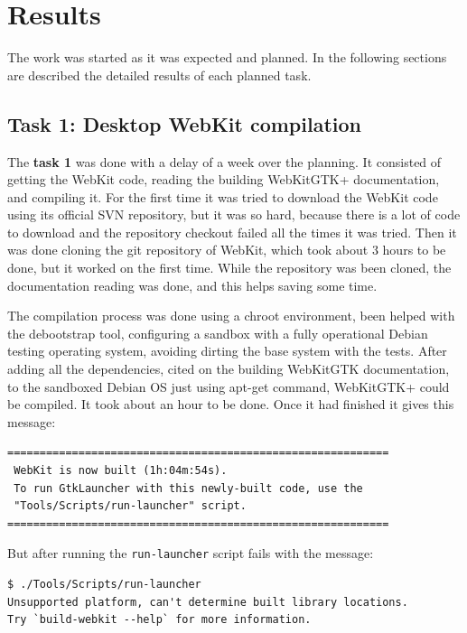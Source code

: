 \documentclass[a4paper,11pt,openany]{report}
\begin{document}
\chapter{Results}
The work was started as it was expected and planned. In the following sections are described the detailed results of each planned task.

\section{Task 1: Desktop WebKit compilation}
The \textbf{task 1} was done with a delay of a week over the planning. It consisted of getting the WebKit code, reading the building WebKitGTK+\cite{build webkitgtk+} documentation, and compiling it.
For the first time it was tried to download the WebKit code using its official SVN repository, but it was so hard, because there is a lot of code to download and the repository checkout failed all the times it was tried. Then it was done cloning the git repository of WebKit\cite{git webkit}, which took about 3 hours to be done, but it worked on the first time.
While the repository was been cloned, the documentation reading was done, and this helps saving some time.

The compilation process was done using a chroot\cite{chroot} environment, been helped with the debootstrap\cite{debootstrap} tool, configuring a sandbox with a fully operational Debian testing operating system, avoiding dirting the base system with the tests.
After adding all the dependencies, cited on the building WebKitGTK documentation, to the sandboxed Debian OS just using apt-get command, WebKitGTK+ could be compiled. It took about an hour to be done. Once it had finished it gives this message:

{
\footnotesize
\begin{lstlisting}
===========================================================
 WebKit is now built (1h:04m:54s).
 To run GtkLauncher with this newly-built code, use the
 "Tools/Scripts/run-launcher" script.
===========================================================
\end{lstlisting}
}

But after running the \verb#run-launcher# script fails with the message:

{
\footnotesize
\begin{lstlisting}
$ ./Tools/Scripts/run-launcher
Unsupported platform, can't determine built library locations.
Try `build-webkit --help` for more information.
\end{lstlisting}
}
\end{document}
